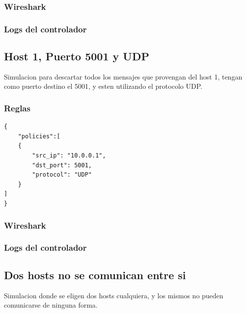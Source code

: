 \documentclass{article}
\begin{document}
\subsubsection{Wireshark}
\begin{center}
\end{center}

\subsubsection{Logs del controlador}
\begin{center}
\end{center}


\subsection{Host 1, Puerto 5001 y UDP}
Simulacion para descartar todos los mensajes que provengan del host 1, tengan como puerto destino el 5001, y esten utilizando el protocolo UDP.

\subsubsection{Reglas}

\begin{verbatim}
{
    "policies":[
    {
        "src_ip": "10.0.0.1",
        "dst_port": 5001,
        "protocol": "UDP"
    }
]
}
\end{verbatim}

\subsubsection{Wireshark}
\begin{center}
\end{center}

\subsubsection{Logs del controlador}
\begin{center}
\end{center}

\subsection{Dos hosts no se comunican entre si}
Simulacion donde se eligen dos hosts cualquiera, y los mismos no pueden comunicarse de ninguna forma.
\end{document}
